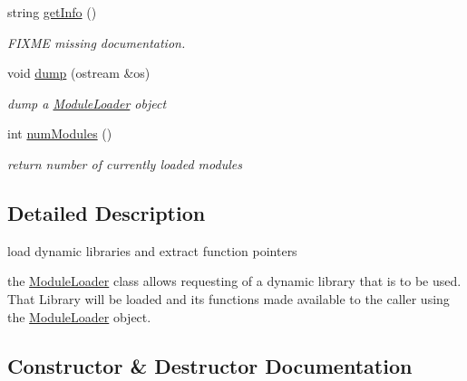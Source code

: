 \begin{DoxyCompactItemize}
string \hyperlink{classModuleLoader_af3bc48297a382f05a39d0f63adc7afe4}{get\+Info} ()
\begin{DoxyCompactList}\small\item\em F\+I\+X\+ME missing documentation. \end{DoxyCompactList}\item 
void \hyperlink{classModuleLoader_a863d9c602af7d21714d0096c57780af7}{dump} (ostream \&os)
\begin{DoxyCompactList}\small\item\em dump a \hyperlink{classModuleLoader}{Module\+Loader} object \end{DoxyCompactList}\item 
\mbox{\label{classModuleLoader_a216786f53c44b08506a26e595ab40d38}} 
int \hyperlink{classModuleLoader_a216786f53c44b08506a26e595ab40d38}{num\+Modules} ()
\begin{DoxyCompactList}\small\item\em return number of currently loaded modules \end{DoxyCompactList}\end{DoxyCompactItemize}


\subsection{Detailed Description}
load dynamic libraries and extract function pointers 

the \hyperlink{classModuleLoader}{Module\+Loader} class allows requesting of a dynamic library that is to be used. That Library will be loaded and it\textquotesingle{}s functions made available to the caller using the \hyperlink{classModuleLoader}{Module\+Loader} object. 

\subsection{Constructor \& Destructor Documentation}
\mbox{\label{classModuleLoader_ab7ab1224836096260ae1a325941fe24c}} 
